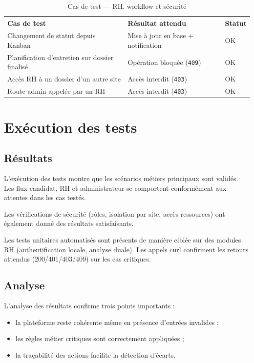 \begin{table}[H]
\centering
\caption{Cas de test --- RH, workflow et sécurité}
\begin{tabularx}{\textwidth}{|X|X|l|}
\hline
\textbf{Cas de test} & \textbf{Résultat attendu} & \textbf{Statut} \\
\hline
Changement de statut depuis Kanban & Mise à jour en base + notification &
\textcolor{green!60!black}{OK} \\
\hline
Planification d'entretien sur dossier finalisé & Opération bloquée
(\texttt{409}) & \textcolor{green!60!black}{OK} \\
\hline
Accès RH à un dossier d'un autre site & Accès interdit (\texttt{403}) &
\textcolor{green!60!black}{OK} \\
\hline
Route admin appelée par un RH & Accès interdit (\texttt{403}) &
\textcolor{green!60!black}{OK} \\
\hline
\end{tabularx}
\end{table}

\section{Exécution des tests}

\subsection{Résultats}

L'exécution des tests montre que les scénarios métiers principaux sont
validés. Les flux candidat, RH et administrateur se comportent
conformément aux attentes dans les cas testés.

Les vérifications de sécurité (rôles, isolation par site, accès ressources)
ont également donné des résultats satisfaisants.

Les tests unitaires automatisés sont présents de manière ciblée sur des
modules RH (authentification locale, analyse duale). Les appels curl
confirment les retours attendus (200/401/403/409) sur les cas critiques.

\subsection{Analyse}

L'analyse des résultats confirme trois points importants :
\begin{itemize}
    \item la plateforme reste cohérente même en présence d'entrées
    invalides ;
    \item les règles métier critiques sont correctement appliquées ;
    \item la traçabilité des actions facilite la détection d'écarts.
\end{itemize}

